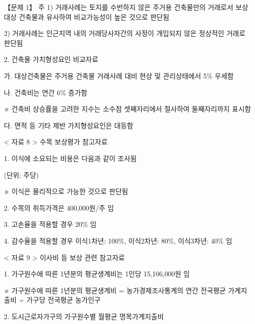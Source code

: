 \begin{longquestion}{【문제 1】}
주 1) 거래사례는 토지를 수반하지 않은 주거용 건축물만의 거래로서 보상대상 건축물과 유사하여 비교가능성이 높은 것으로 판단됨 \par
2) 거래사례는 인근지역 내의 거래당사자간의 사정이 개입되지 않은 정상적인 거래로 판단됨 \par
2. 건축물 가치형성요인 비교자료 \par
가. 대상건축물은 주거용 건축물 거래사례 대비 현상 및 관리상태에서 5\% 우세함 \par
나. 건축비는 연간 6\% 증가함 \par
※ 건축비 상승률을 고려한 지수는 소수점 셋째자리에서 절사하여 둘째자리까지 표시함 \par
다. 면적 등 기타 제반 가치형성요인은 대등함 \par
< 자료 8 > 수목 보상평가 참고자료 \par
1. 이식에 소요되는 비용은 다음과 같이 조사됨 \par
(단위: 주당) \par
{\small\centering\renewcommand{\arraystretch}{1.25}
\par}

※ 이식은 물리적으로 가능한 것으로 판단됨 \par
2. 수목의 취득가격은 400,000원/주 임 \par
3. 고손율을 적용할 경우 20\% 임 \par
4. 감수율을 적용할 경우 이식1차년: 100\%, 이식2차년: 80\%, 이식3차년: 40\% 임 \par
< 자료 9 > 이사비 등 보상 관련 참고자료 \par
1. 가구원수에 따른 1년분의 평균생계비는 1인당 15,106,000원 임 \par
※ 가구원수에 따른 1년분의 평균생계비 = 농가경제조사통계의 연간 전국평균 가계지출비 ÷ 가구당 전국평균 농가인구 \par
2. 도시근로자가구의 가구원수별 월평균 명목가계지출비 \par
{\small\centering\renewcommand{\arraystretch}{1.25}
\par}


\end{longquestion}
